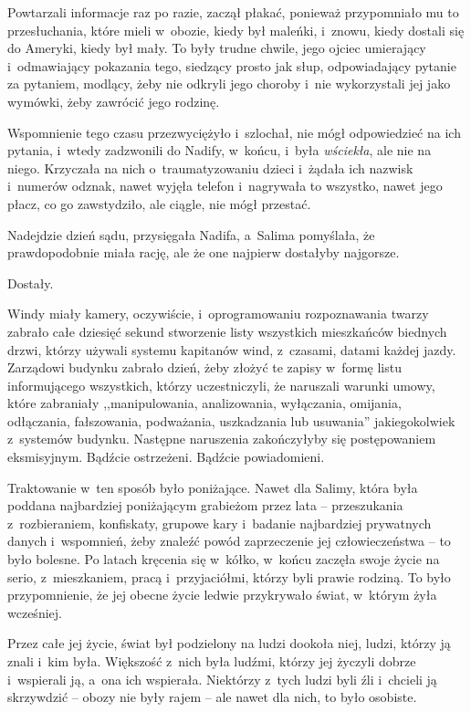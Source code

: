 \documentclass[oneside,polish,11pt,sfheadings]{mwbk}
\begin{document}
Powtarzali informacje raz po razie, zaczął płakać, ponieważ przypomniało
mu to przesłuchania, które mieli w~obozie, kiedy był maleńki, i~znowu,
kiedy dostali się do Ameryki, kiedy był mały. To były trudne chwile,
jego ojciec umierający i~odmawiający pokazania tego, siedzący prosto jak
słup, odpowiadający pytanie za pytaniem, modlący, żeby nie odkryli jego
choroby i~nie wykorzystali jej jako wymówki, żeby zawrócić jego rodzinę.

Wspomnienie tego czasu przezwyciężyło i~szlochał, nie mógł odpowiedzieć
na ich pytania, i~wtedy zadzwonili do Nadify, w~końcu, i~była
\textit{wściekła}, ale nie na niego. Krzyczała na nich o~traumatyzowaniu
dzieci i~żądała ich nazwisk i~numerów odznak, nawet wyjęła telefon i~nagrywała to wszystko, nawet jego płacz, co go zawstydziło, ale ciągle,
nie mógł przestać.

Nadejdzie dzień sądu, przysięgała Nadifa, a~Salima pomyślała, że
prawdopodobnie miała rację, ale że one najpierw dostałyby najgorsze.

Dostały.

Windy miały kamery, oczywiście, i~oprogramowaniu rozpoznawania twarzy
zabrało całe dziesięć sekund stworzenie listy wszystkich mieszkańców
biednych drzwi, którzy używali systemu kapitanów wind, z~czasami, datami
każdej jazdy. Zarządowi budynku zabrało dzień, żeby złożyć te zapisy w~formę listu informującego wszystkich, którzy uczestniczyli, że naruszali
warunki umowy, które zabraniały ,,manipulowania, analizowania,
wyłączania, omijania, odłączania, fałszowania, podważania, uszkadzania
lub usuwania'' jakiegokolwiek z~systemów budynku. Następne naruszenia
zakończyłyby się postępowaniem eksmisyjnym. Bądźcie ostrzeżeni. Bądźcie
powiadomieni.

Traktowanie w~ten sposób było poniżające. Nawet dla Salimy, która była
poddana najbardziej poniżającym grabieżom przez lata -- przeszukania z~rozbieraniem, konfiskaty, grupowe kary i~badanie najbardziej prywatnych
danych i~wspomnień, żeby znaleźć powód zaprzeczenie jej człowieczeństwa
-- to było bolesne. Po latach kręcenia się w~kółko, w~końcu zaczęła swoje
życie na serio, z~mieszkaniem, pracą i~przyjaciółmi, którzy byli prawie
rodziną. To było przypomnienie, że jej obecne życie ledwie przykrywało
świat, w~którym żyła wcześniej.

Przez całe jej życie, świat był podzielony na ludzi dookoła niej, ludzi,
którzy ją znali i~kim była. Większość z~nich była ludźmi, którzy jej
życzyli dobrze i~wspierali ją, a~ona ich wspierała. Niektórzy z~tych
ludzi byli źli i~chcieli ją skrzywdzić -- obozy nie były rajem -- ale
nawet dla nich, to było osobiste.
\end{document}

